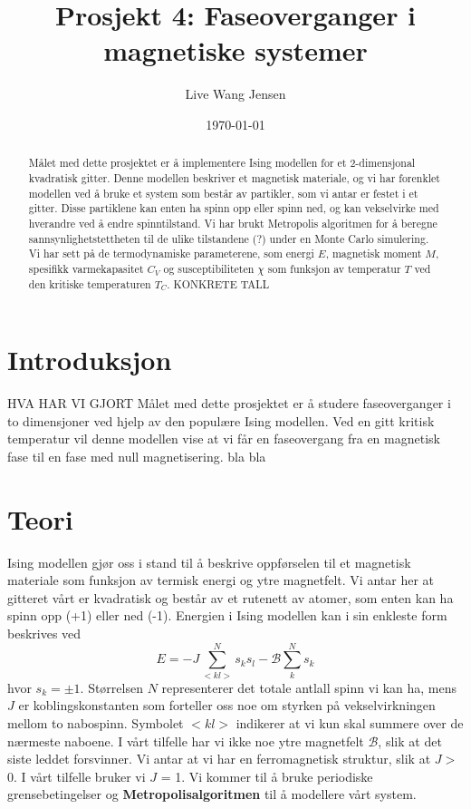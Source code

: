 \documentclass[11pt,a4paper]{article}
\begin{document}
\title{Prosjekt 4: Faseoverganger i magnetiske systemer }
\author{Live Wang Jensen}
\date{\today}

\maketitle

\begin{abstract}
Målet med dette prosjektet er å implementere Ising modellen for et 2-dimensjonal kvadratisk gitter. Denne modellen beskriver et magnetisk materiale, og vi har forenklet modellen ved å bruke et system som består av partikler, som vi antar er festet i et gitter. Disse partiklene kan enten ha spinn opp eller spinn ned, og kan vekselvirke med hverandre ved å endre spinntilstand. Vi har brukt Metropolis algoritmen for å beregne sannsynlighetstettheten til de ulike tilstandene (?) under en Monte Carlo simulering. Vi har sett på de termodynamiske parameterene, som energi $E$, magnetisk moment $M$, spesifikk varmekapasitet $C_V$ og susceptibiliteten $\chi$ som funksjon av temperatur $T$ ved den kritiske temperaturen $T_C$. KONKRETE TALL

\end{abstract}

\tableofcontents

\clearpage
\section{Introduksjon}
HVA HAR VI GJORT
Målet med dette prosjektet er å studere faseoverganger i to dimensjoner ved hjelp av den populære Ising modellen. Ved en gitt kritisk temperatur vil denne modellen vise at vi får en faseovergang fra en magnetisk fase til en fase med null magnetisering.
bla bla



\section{Teori}
Ising modellen gjør oss i stand til å beskrive oppførselen til et magnetisk materiale som funksjon av termisk energi og ytre magnetfelt. Vi antar her at gitteret vårt er kvadratisk og består av et rutenett av atomer, som enten kan ha spinn opp (+1) eller ned (-1). Energien i Ising modellen kan i sin enkleste form beskrives ved 
\begin{equation}
E = -J\sum_{<kl>}^N s_ks_l - \mathcal{ B} \sum_k^N s_k
\end{equation}
hvor $s_k = \pm 1$. Størrelsen $N$ representerer det totale antlall spinn vi kan ha, mens $J$ er koblingskonstanten som forteller oss noe om styrken på vekselvirkningen mellom to nabospinn. Symbolet $<kl>$ indikerer at vi kun skal summere over de nærmeste naboene. I vårt tilfelle har vi ikke noe ytre magnetfelt $\mathcal{B}$, slik at det siste leddet forsvinner. Vi antar at vi har en ferromagnetisk struktur, slik at $J >$ 0. I vårt tilfelle bruker vi $J$ = 1. Vi kommer til å bruke periodiske grensebetingelser og \textbf{Metropolisalgoritmen} til å modellere vårt system. \\
\end{document}

